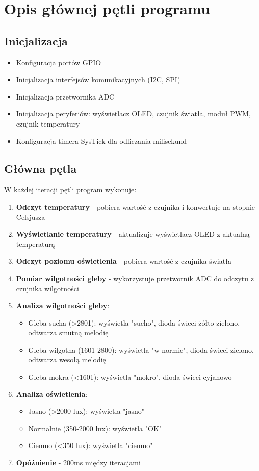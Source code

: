 \section{Opis głównej pętli programu}

\subsection{Inicjalizacja}
\begin{itemize}
    \item Konfiguracja portów GPIO
    \item Inicjalizacja interfejsów komunikacyjnych (I2C, SPI)
    \item Inicjalizacja przetwornika ADC
    \item Inicjalizacja peryferiów: wyświetlacz OLED, czujnik światła, moduł PWM, czujnik temperatury
    \item Konfiguracja timera SysTick dla odliczania milisekund
\end{itemize}

\subsection{Główna pętla}
W każdej iteracji pętli program wykonuje:

\begin{enumerate}
    \item \textbf{Odczyt temperatury} - pobiera wartość z czujnika i konwertuje na stopnie Celsjusza
    \item \textbf{Wyświetlanie temperatury} - aktualizuje wyświetlacz OLED z aktualną temperaturą
    \item \textbf{Odczyt poziomu oświetlenia} - pobiera wartość z czujnika światła
    \item \textbf{Pomiar wilgotności gleby} - wykorzystuje przetwornik ADC do odczytu z czujnika wilgotności
    \item \textbf{Analiza wilgotności gleby}:
    \begin{itemize}
        \item Gleba sucha (>2801): wyświetla "sucho", dioda świeci żółto-zielono, odtwarza smutną melodię
        \item Gleba wilgotna (1601-2800): wyświetla "w normie", dioda świeci zielono, odtwarza wesołą melodię
        \item Gleba mokra (<1601): wyświetla "mokro", dioda świeci cyjanowo
    \end{itemize}
    \item \textbf{Analiza oświetlenia}:
    \begin{itemize}
        \item Jasno (>2000 lux): wyświetla "jasno"
        \item Normalnie (350-2000 lux): wyświetla "OK"
        \item Ciemno (<350 lux): wyświetla "ciemno"
    \end{itemize}
    \item \textbf{Opóźnienie} - 200ms między iteracjami
\end{enumerate}
